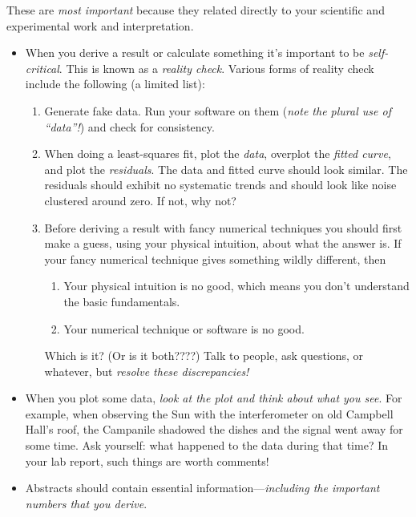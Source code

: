 \documentclass[12pt,preprint]{aastex}
\begin{document}
	These are {\it most important} because they related directly to
your scientific and experimental work and interpretation. 
\begin{itemize}

\item When you derive a result or calculate something it's important to
be {\it self-critical}. This is known as a {\it reality check}. Various forms
of reality check include the following (a limited list):
\begin{enumerate}

	\item Generate fake data. Run your software on them ({\it note
the plural use of ``data''!}) and check for consistency. 

	\item When doing a least-squares fit, plot the {\it data},
overplot the {\it fitted curve}, and plot the {\it residuals}. The data
and fitted curve should look similar. The residuals should exhibit no
systematic trends and should look like noise clustered around zero. If
not, why not?

	\item Before deriving a result with fancy numerical techniques
you should first make a guess, using your physical intuition, about what the
answer is. If your fancy numerical technique gives something wildly
different, then  \begin{enumerate}

	\item Your physical intuition is no good, which means you don't
understand the basic fundamentals. 

	\item Your numerical technique or software is no good.
\end{enumerate}

\noindent Which is it? (Or is it both????) Talk to people, ask
questions, or whatever, but {\it resolve these discrepancies!}

\end{enumerate}

	\item When you plot some data, {\it look at the plot and think
          about what you see}.  For example, when observing the Sun with
          the interferometer on old Campbell Hall's roof, the Campanile
          shadowed the dishes and the signal went away for some time.
          Ask yourself: what happened to the data during that time? In
          your lab report, such things are worth comments!

\item Abstracts should contain essential information---{\it including the
important numbers that you derive}. 

\end{itemize}
\end{document}
